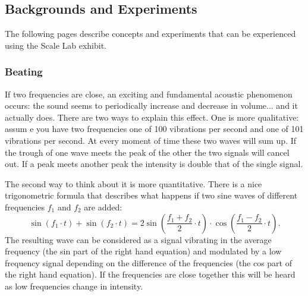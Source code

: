 \subsection{Backgrounds and Experiments}
The following pages describe concepts and experiments that can be experienced using the Scale Lab exhibit.

\subsubsection{Beating}
If two frequencies are close, an exciting and fundamental acoustic phenomenon occurs: the sound seems to periodically increase and decrease in volume... and it actually does. There are two ways to explain this effect. One is more qualitative: assum
e you have two frequencies one of 100 vibrations per second and one of 101 vibrations per second. At every moment of time these two waves will sum up. If the trough of one wave meets the peak of the other the two signals will cancel out. If a peak meets another peak the intensity is double that of the single signal.

\begin{figure}[h]
\centering
{}
\end{figure}

The second way to think about it is more quantitative. There is a nice trigonometric formula that describes what happens if two sine waves of different frequencies $f_1$ and $f_2$ are added:
$$\sin(f_1 \cdot t) + \sin(f_2\cdot t) = 2 \sin\left( \frac{f_1+f_2}{2}\cdot t\right) \cdot \cos\left( \frac{f_1-f_2}{2}\cdot t\right) .$$
The resulting wave can be considered as a signal vibrating in the average frequency (the sin part of the right hand equation) and modulated by a low frequency signal depending on the difference of the frequencies (the cos part of the right hand equation). If the frequencies are close together this will be heard as low frequencies change in intensity.

